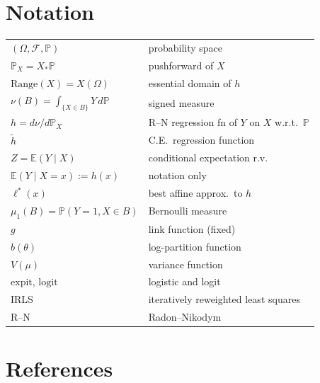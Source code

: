 \documentclass[12pt, a4paper]{article}
\theoremstyle{definition}
\newcommand{\E}{\mathbb{E}}
\newcommand{\Prob}{\mathbb{P}}
\newcommand{\sF}{\mathcal{F}}
\newcommand{\expit}{\mathrm{expit}}
\newcommand{\logit}{\mathrm{logit}}
\newcommand{\Range}{\mathrm{Range}}
\begin{document}
\section{Notation}
\begin{tabular}{@{}ll@{}}
$(\Omega,\sF,\Prob)$ & probability space \\
$\Prob_X=X_*\Prob$ & pushforward of $X$ \\
$\Range(X)=X(\Omega)$ & essential domain of $h$ \\
$\nu(B)=\int_{\{X\in B\}}Y\,d\Prob$ & signed measure \\
$h=d\nu/d\Prob_X$ & R--N regression fn of $Y$ on $X$ w.r.t.\ $\Prob$ \\
$\tilde h$ & C.E.\ regression function \\
$Z=\E(Y\mid X)$ & conditional expectation r.v. \\
$\E(Y\mid X=x):=h(x)$ & notation only \\
$\ell^*(x)$ & best affine approx.\ to $h$ \\
$\mu_1(B)=\Prob(Y=1,X\in B)$ & Bernoulli measure \\
$g$ & link function (fixed) \\
$b(\theta)$ & log-partition function \\
$V(\mu)$ & variance function \\
$\expit$, $\logit$ & logistic and logit \\
IRLS & iteratively reweighted least squares \\
R--N & Radon--Nikodym \\
\end{tabular}

\section{References}
\end{document}
